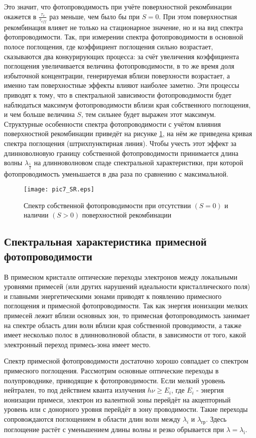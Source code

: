 Это значит, что фотопроводимость при учёте поверхностной рекомбинации окажется в $\frac{\tau_{v}}{\tau_{eff}}$ раз меньше, чем было бы при $S = 0$. При этом поверхностная рекомбинация влияет не только на стационарное значение, но и на вид спектра фотопроводимости. Так, при измерении спектра фотопроводимости в основной полосе поглощения, где коэффициент поглощения сильно возрастает, сказываются два конкурирующих процесса: за счёт увеличения коэффициента поглощения увеличивается величина фотопроводимости, в то же время доля избыточной концентрации, генерируемая вблизи поверхности возрастает, а именно там поверхностные эффекты влияют наиболее заметно. Эти процессы приводят к тому, что в спектральной зависимости фотопроводимости будет наблюдаться максимум фотопроводимости вблизи края собственного поглощения, и чем больше величина $S$, тем сильнее будет выражен этот максимум. Структурные особенности спектра фотопроводимости с учётом влияния поверхностной рекомбинации приведёт на рисунке \ref{pic7_SR}, на нём же приведена кривая спектра поглощения (штрихпунктирная линия). Чтобы учесть этот эффект за длинноволновую границу собственной фотопроводимости принимается длина волны $\lambda_{\frac{1}{2}}$ на длинноволновом спаде спектральной характеристики, при которой фотопроводимость уменьшается в два раза по сравнению с максимальной.

\begin{figure}[h!]\centering
\texttt{[image: pic7\_SR.eps]}
\caption{Спектр собственной фотопроводимости при отсутствии $(S = 0)$ и наличии $(S > 0)$ поверхностной рекомбинации}
\label{pic7_SR}
\end{figure}

\subsection{Спектральная характеристика примесной фотопроводимости}
В примесном кристалле оптические переходы электронов между локальными уровнями примесей (или других нарушений идеальности кристаллического поля) и главными энергетическими зонами приводят к появлению примесного поглощения и примесной фотопроводимости. Так как энергия ионизации мелких примесей лежит вблизи основных зон, то примесная фотопроводимость занимает на спектре область длин волн вблизи края собственной проводимости, а также имеет несколько полос в длинноволновой области, в зависимости от того, какой электронный переход примесь-зона имеет место.

Спектр примесной фотопроводимости достаточно хорошо совпадает со спектром примесного поглощения. Рассмотрим основные оптические переходы в полупроводнике, приводящие к фотопроводимости. Если мелкий уровень нейтрален, то под действием кванта излучения $h \nu \ge E_{i}$, где $E_{i}$  - энергия ионизации примеси, электрон из валентной зоны перейдёт на акцепторный уровень или с донорного уровня перейдёт в зону проводимости. Такие переходы сопровождаются поглощением в области длин волн между $\lambda_{i}$ и $\lambda_{\text{гр}}$. Здесь поглощение растёт с уменьшением длины волны и резко обрывается при $\lambda = \lambda_{\text{i}}$.

